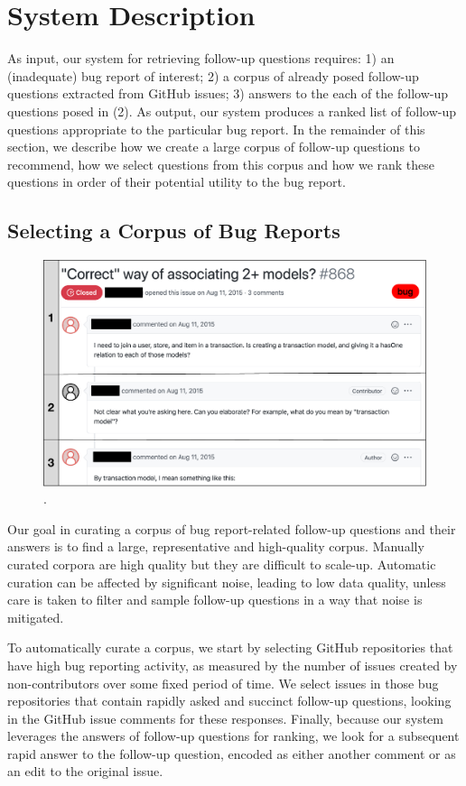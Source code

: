 \section{System Description}

As input, our system for retrieving follow-up questions requires: 1) an (inadequate) bug
report of interest; 2) a corpus of already posed follow-up questions extracted
from GitHub issues; 3) answers to the each of the follow-up questions posed in (2). As output, our system
produces a ranked list of follow-up questions appropriate to the particular bug report.
In the remainder of this section, we describe how we create a large corpus of follow-up questions
to recommend, how we select questions from this corpus and how we rank these questions in order
of their potential utility to the bug report.

\subsection{Selecting a Corpus of Bug Reports}


\begin{figure}[ht]
\centering
\includegraphics[width=0.70\linewidth]{figures/sample_issue.pdf}
\caption{.}
\label{fig:sample_br}
\end{figure}

Our goal in curating a corpus of bug report-related follow-up questions and their answers
is to find a large, representative and high-quality corpus. Manually curated corpora are
high quality but they are difficult to scale-up. Automatic curation can be affected by
significant noise, leading to low data quality, unless care is taken
to filter and sample follow-up questions in a way that noise is mitigated.

To automatically curate a corpus, we start by selecting GitHub repositories that have high bug reporting activity,
as measured by the number of issues created by non-contributors over some fixed period of time.
We select issues in those bug repositories that contain rapidly asked and succinct follow-up
questions, looking in the GitHub issue comments for these responses. Finally, because our system leverages
the answers of follow-up questions for ranking, we look for
a subsequent rapid answer to the follow-up question, encoded as either another comment or as an edit to the
original issue.

